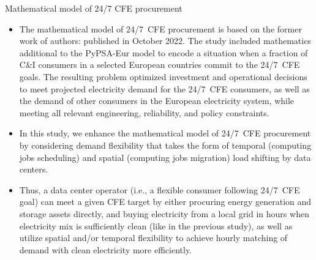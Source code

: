 \begin{frame}{Mathematical model of 24/7 CFE procurement}

  {\footnotesize
  \begin{itemize}
  \item The mathematical model of 24/7~CFE procurement is based on the former work of authors:  published in October 2022. The study included mathematics additional to the PyPSA-Eur model to encode a situation when a fraction of C\&I consumers in a selected European countries commit to the 24/7~CFE goals. The resulting problem optimized investment and operational decisions to meet projected electricity demand for the 24/7~CFE consumers, as well as the demand of other consumers in the European electricity system, while meeting all relevant engineering, reliability, and policy constraints.
  
  \item In this study, we enhance the mathematical model of 24/7~CFE procurement 
  by considering demand flexibility that takes the form of \alert{temporal} (computing jobs scheduling) and \alert{spatial} (computing jobs migration) load shifting by data centers. 
  
  \item Thus, a data center operator (i.e., a flexible consumer following 24/7~CFE goal) can meet a given CFE target by either procuring energy generation and storage assets directly, and buying electricity from a local grid in hours when electricity mix is sufficiently clean  (like in the previous study), as well as utilize spatial and/or temporal flexibility to achieve hourly matching of demand with clean electricity more efficiently.

  \end{itemize}
  }
\end{frame}



